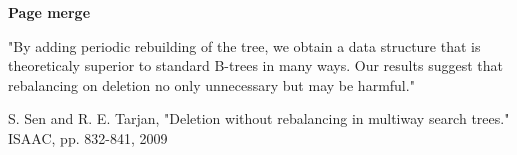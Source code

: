 \documentclass[usenames,dvipsnames, 18pt, compress, aspectratio=169]{beamer}
\begin{document}
\begin{frame}[fragile]{}
\begin{center}
\begin{overprint}[8cm]

    \end{overprint}
    \end{center}

\end{frame}

\begin{frame}[fragile]{}
    \frametitle{}

    \begin{center}
    \textbf{Page merge}
    \end{center}

    \begin{flushleft}
        \begin{displayquote}
            "By adding periodic rebuilding of the tree, we obtain a data
            structure that is theoreticaly superior to standard B-trees in many
            ways. Our results suggest that rebalancing on deletion no only
            unnecessary but may be harmful."
        \end{displayquote}
        \footnotesize{S. Sen and R. E. Tarjan, "Deletion without rebalancing in multiway
        search trees." ISAAC, pp. 832-841, 2009}
    \end{flushleft}

\end{frame}
\end{document}
